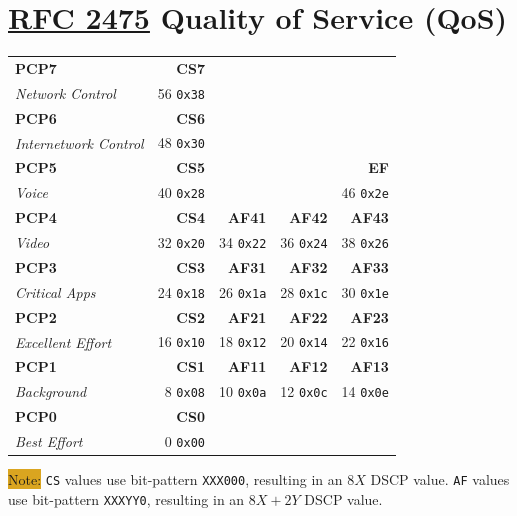 \documentclass[12pt]{article}
\newcommand{\note}[1]{\colorbox{#1}{Note:}}
\newcommand{\RFC}[1]{\href{https://datatracker.ietf.org/doc/html/rfc#1}{RFC #1}}
\begin{document}
\section[RFC 2475 QoS]{\RFC{2475} Quality of Service (QoS) \label{sec:QOS}}
	\begin{table}[H]
	\centering
	\begin{tabular}{ l r r r r }
	\textbf{PCP7}			& \textbf{CS7}	&			&			&\\
	\textit{Network Control}	& 56 \texttt{0x38}	&			&			&\\
	\textbf{PCP6}			& \textbf{CS6}	&			&			&\\
	\textit{Internetwork Control}	& 48 \texttt{0x30}	&			&			&\\
	\textbf{PCP5}			& \textbf{CS5}	&			&			& \textbf{EF}\\
	\textit{Voice}			& 40 \texttt{0x28}	&			&			& 46 \texttt{0x2e}\\
	\textbf{PCP4}			& \textbf{CS4}	& \textbf{AF41}	& \textbf{AF42}	& \textbf{AF43}\\
	\textit{Video}			& 32 \texttt{0x20} & 34 \texttt{0x22} & 36 \texttt{0x24} & 38 \texttt{0x26}\\
	\textbf{PCP3}			& \textbf{CS3}	& \textbf{AF31}	& \textbf{AF32}	& \textbf{AF33}\\
	\textit{Critical Apps}		& 24 \texttt{0x18} & 26 \texttt{0x1a} & 28 \texttt{0x1c} & 30 \texttt{0x1e}\\
	\textbf{PCP2}			& \textbf{CS2}	& \textbf{AF21}	& \textbf{AF22}	& \textbf{AF23}\\
	\textit{Excellent Effort}		& 16 \texttt{0x10} & 18 \texttt{0x12} & 20 \texttt{0x14} & 22 \texttt{0x16}\\
	\textbf{PCP1}			& \textbf{CS1}	& \textbf{AF11}	& \textbf{AF12}	& \textbf{AF13}\\
	\textit{Background}		& 8 \texttt{0x08} & 10 \texttt{0x0a} & 12 \texttt{0x0c} & 14 \texttt{0x0e}\\
	\textbf{PCP0}			& \textbf{CS0}	&			&			&\\
	\textit{Best Effort}			& 0 \texttt{0x00} &			&			&\\
	\end{tabular}\end{table}
	\note{Goldenrod} \texttt{CS} values use bit-pattern \texttt{XXX000}, resulting in an $8X$ DSCP value. \texttt{AF} values use bit-pattern \texttt{XXXYY0}, resulting in an $8X+2Y$ DSCP value.
\end{document}
